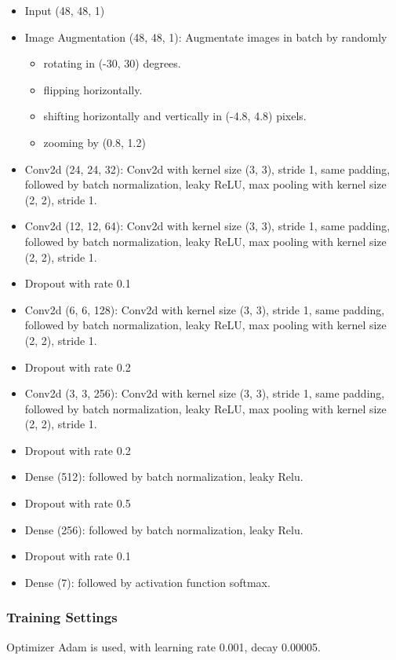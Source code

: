 \documentclass[fleqn,a4paper,12pt]{article}
\begin{document}
\begin{itemize}
\item
  Input (48, 48, 1)
\item
  Image Augmentation (48, 48, 1): Augmentate images in batch by randomly
  \begin{itemize}
  \item rotating in (-30, 30) degrees.
  \item flipping horizontally.
  \item shifting horizontally and vertically in (-4.8, 4.8) pixels.
  \item zooming by (0.8, 1.2)
  \end{itemize}
\item
  Conv2d (24, 24, 32): Conv2d with kernel size (3, 3), stride 1, same padding, followed by batch normalization, leaky ReLU, max pooling with kernel size (2, 2), stride 1.
\item
  Conv2d (12, 12, 64): Conv2d with kernel size (3, 3), stride 1, same padding, followed by batch normalization, leaky ReLU, max pooling with kernel size (2, 2), stride 1.
\item
  Dropout with rate 0.1
\item
  Conv2d (6, 6, 128): Conv2d with kernel size (3, 3), stride 1, same padding, followed by batch normalization, leaky ReLU, max pooling with kernel size (2, 2), stride 1.
\item
  Dropout with rate 0.2
\item
  Conv2d (3, 3, 256): Conv2d with kernel size (3, 3), stride 1, same padding, followed by batch normalization, leaky ReLU, max pooling with kernel size (2, 2), stride 1.
\item
  Dropout with rate 0.2
\item Dense (512): followed by batch normalization, leaky Relu.
\item
  Dropout with rate 0.5
\item Dense (256): followed by batch normalization, leaky Relu.
\item
  Dropout with rate 0.1
\item
  Dense (7): followed by activation function softmax.
\end{itemize}

\subsubsection*{Training Settings}

Optimizer Adam is used, with learning rate 0.001, decay 0.00005.
\end{document}

